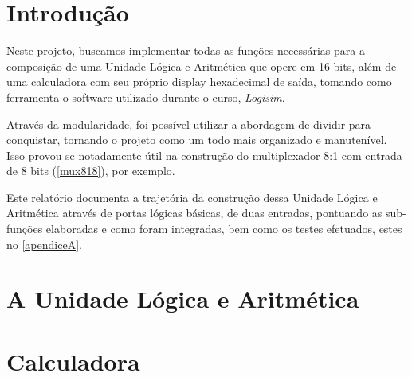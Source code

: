 \documentclass[
	12pt,				%
	openright,			%
	twoside,			%
	a4paper,			%
	english,			%
	french,				%
	spanish,			%
	brazil,				%
	]{abntex2}
\begin{document}

\frenchspacing

\imprimircapa

\imprimirfolhaderosto

\tableofcontents* %

\textual

\chapter*[Introdução]{Introdução}

\lipsum[10]

Neste projeto, buscamos implementar todas as funções necessárias para a composição de uma Unidade Lógica e Aritmética que opere em 16 bits, além de uma calculadora com seu próprio display hexadecimal de saída, tomando como ferramenta o software utilizado durante o curso, \textit{Logisim}.

Através da modularidade, foi possível utilizar a abordagem de dividir para conquistar, tornando o projeto como um todo mais organizado e manutenível. Isso provou-se notadamente útil na construção do multiplexador 8:1 com entrada de 8 bits (\autoref{mux818}), por exemplo.

Este relatório documenta a trajetória da construção dessa Unidade Lógica e Aritmética através de portas lógicas básicas, de duas entradas, pontuando as sub-funções elaboradas e como foram integradas, bem como os testes efetuados, estes no \autoref{apendiceA}.

\chapter{A Unidade Lógica e Aritmética}

\lipsum[11]

\chapter{Calculadora}

\lipsum[12]
\end{document}

